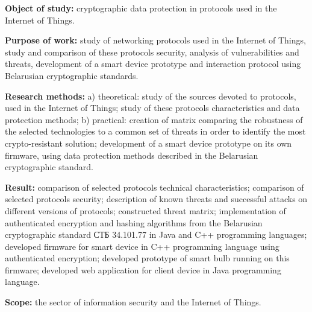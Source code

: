 \textbf{Object of study:} cryptographic data protection in protocols used in the Internet of Things.

\textbf{Purpose of work:} study of networking protocols used in the Internet of Things, study and 
comparison of these protocols security, analysis of vulnerabilities and threats, development 
of a smart device prototype and interaction protocol using Belarusian cryptographic standards.

\textbf{Research methods:} a) theoretical: study of the sources devoted to protocols, used in the 
Internet of Things; study of these protocols characteristics and data protection methods; 
b) practical: creation of matrix comparing the robustness of the selected technologies to a common 
set of threats in order to identify the most crypto-resistant solution; development 
of a smart device prototype on its own firmware, using data protection methods described in the Belarusian 
cryptographic standard.

\textbf{Result:} comparison of selected protocols technical characteristics; comparison of selected protocols security; 
description of known threats and successful attacks on different versions of protocols; constructed threat matrix; 
implementation of authenticated encryption and hashing algorithms from the Belarusian cryptographic standard СТБ 34.101.77 
in Java and C++ programming languages; developed firmware for smart device in C++ programming language using 
authenticated encryption; developed prototype of smart bulb running on this firmware; developed web application 
for client device in Java programming language.

\textbf{Scope:} the sector of information security and the Internet of Things.
